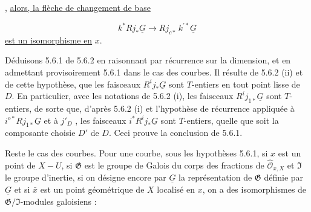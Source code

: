 \begin{center}
\end{center}
,
\underline{alors, la flèche de changement de base}

\begin{equation*}
k^* Rj_*\underline{G} \longrightarrow Rj_{c*}\, k^{\prime *}\underline{G}
\end{equation*}
\underline{est un isomorphisme en} $x$.

Déduisons 5.6.1 de 5.6.2 en raisonnant par récurrence sur la dimension, et en admettant provisoirement 5.6.1 dans le cas des courbes. Il résulte de 5.6.2 (ii) et de cette hypothèse, que les faisceaux $R^i j_*\underline{G}$ sont $T$-entiers en tout point lisse de $D$. En particulier, avec les notations de 5.6.2 (i), les faisceaux $R^i j_{1*}\underline{G}$ sont $T$-entiers, de sorte que, d'après 5.6.2 (i) et l'hypothèse de récurrence appliquée à $i^{o*} Rj_{1*}\underline{G}$ et à $j'_D$ , les faisceaux $i^* R^i j_*\underline{G}$ sont $T$-entiers, quelle que soit la composante choisie $D'$ de $D$. Ceci prouve la conclusion de 5.6.1.

Reste le cas des courbes. Pour une courbe, sous les hypothèses 5.6.1, si $x$ est un point de $X - U$, si $\mathfrak{G}$ est le groupe de Galois du corps des fractions de $\hat{\mathcal{O}}_{x,X}$ et $\mathfrak{I}$ le groupe d'inertie, si on désigne encore par $\underline{G}$ la représentation de $\mathfrak{G}$ définie par $\underline{G}$ et si $\bar{x}$ est un point géométrique de $X$ localisé en $x$, on a des isomorphismes de $\mathfrak{G}/\mathfrak{I}$-modules galoisiens :

